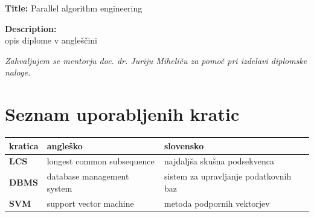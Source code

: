 \documentclass[a4paper,12pt,openright]{book}
\newcommand{\clearemptydoublepage}{\newpage{\pagestyle{empty}\cleardoublepage}}
\begin{document}
\bigskip
\noindent\textbf{Title:} Parallel algorithm engineering

\bigskip
\noindent\textbf{Description:}\\
opis diplome v angleščini

\vfill

\vspace{2cm}

\clearemptydoublepage

\thispagestyle{empty}\mbox{}\vfill\null\it%
\noindent
Zahvaljujem se mentorju doc. dr. Juriju Miheliču za pomoč pri izdelavi diplomske naloge. 
\rm\normalfont

\clearemptydoublepage

\thispagestyle{empty}\mbox{}{\textheight}\mbox{}\hfill\begin{minipage}{0.55\textwidth}%
\normalfont\end{minipage}

\clearemptydoublepage


\pagestyle{empty}
\def\thepage{}%
\tableofcontents{}


\clearemptydoublepage


\chapter*{Seznam uporabljenih kratic}

\noindent\begin{tabular}{p{}|p{}|p{}}    %
  {\bf kratica} & {\bf angleško}                              & {\bf slovensko} \\ \hline
  {\bf LCS}      & longest common subsequence               & najdaljša skušna podsekvenca \\
  {\bf DBMS} & database management system & sistem za upravljanje podatkovnih baz \\
  {\bf SVM}   & support vector machine              & metoda podpornih vektorjev \\
\end{tabular}
\end{document}
